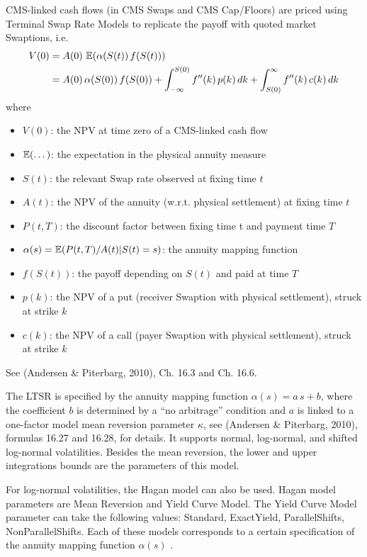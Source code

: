 CMS-linked cash flows (in CMS Swaps and CMS Cap/Floors) are priced using Terminal
Swap Rate Models to replicate the payoff with quoted market Swaptions, i.e.
\begin{align*}
V(0) &= A(0)\,\operatorname{\mathbb{E}}(\alpha(S(t))\,f(S(t))) \\
&= A(0)\,\alpha(S(0))\,f(S(0)) +\int_{-\infty}^{S(0)} f'' (k)\,p(k)\,dk
+ \int_{S(0)}^\infty f''(k)\,c(k)\,dk
\end{align*}
where
\begin{itemize}
\item $V(0)$: the NPV at time zero of a CMS-linked cash flow
\item $\operatorname{\mathbb{E}}(\dots)$: the expectation in the physical annuity measure
\item $S(t)$: the relevant Swap rate observed at fixing time $t$
\item $A(t)$: the NPV of the annuity (w.r.t. physical settlement) at fixing
time $t$
\item $P(t,T)$: the discount factor between fixing time t and payment time $T$
\item $\alpha(s)=\operatorname{\mathbb{E}}(P(t,T)/A(t) | S(t) = s)$: the annuity mapping function
\item $f(S(t))$: the payoff depending on $S(t)$ and paid at time $T$
\item $p(k)$: the NPV of a put (receiver Swaption with physical settlement),
struck at strike $k$
\item $c(k)$: the NPV of a call (payer Swaption with physical settlement),
struck at strike $k$
\end{itemize}
See (Andersen \& Piterbarg, 2010), Ch. 16.3 and Ch. 16.6.

The LTSR is specified by the annuity mapping function $\alpha(s)=a\,s+b$,
where the coefficient $b$ is determined by a ``no arbitrage'' condition and $a$
is linked to a one-factor model mean reversion parameter $\kappa$, see
(Andersen \& Piterbarg, 2010), formulas 16.27 and 16.28, for details. It
supports normal, log-normal, and shifted log-normal volatilities. Besides the
mean reversion, the lower and upper integrations bounds are the parameters of
this model.

For log-normal volatilities, the Hagan model can also be used. Hagan model
parameters are Mean Reversion and Yield Curve Model. The Yield Curve Model
parameter can take the following values: Standard, ExactYield, ParallelShifts,
NonParallelShifts. Each of these models corresponds to a certain specification
of the annuity mapping function $\alpha(s)$ \cite{Hagan_2003}.

